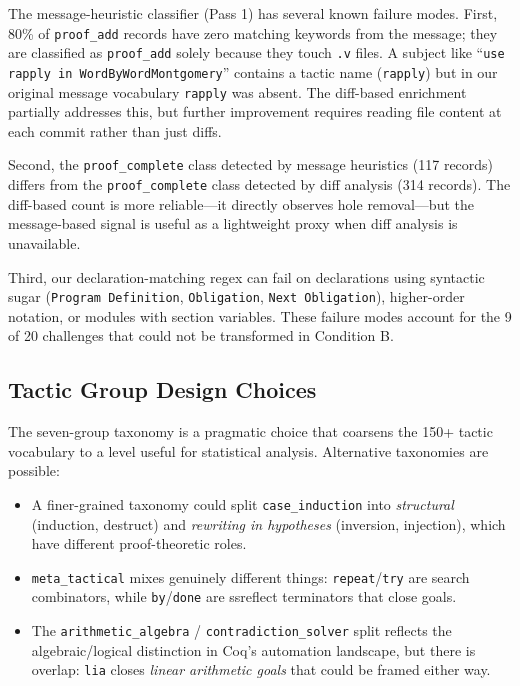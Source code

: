 \documentclass[11pt]{article}
\begin{document}
The message-heuristic classifier (Pass 1) has several known failure modes. First, 80\% of \texttt{proof\_add} records have zero matching keywords from the message; they are classified as \texttt{proof\_add} solely because they touch \texttt{.v} files. A subject like ``\texttt{use rapply in WordByWordMontgomery}'' contains a tactic name (\texttt{rapply}) but in our original message vocabulary \texttt{rapply} was absent. The diff-based enrichment partially addresses this, but further improvement requires reading file content at each commit rather than just diffs.

Second, the \texttt{proof\_complete} class detected by message heuristics (117 records) differs from the \texttt{proof\_complete} class detected by diff analysis (314 records). The diff-based count is more reliable---it directly observes hole removal---but the message-based signal is useful as a lightweight proxy when diff analysis is unavailable.

Third, our declaration-matching regex can fail on declarations using syntactic sugar (\texttt{Program Definition}, \texttt{Obligation}, \texttt{Next Obligation}), higher-order notation, or modules with section variables. These failure modes account for the 9 of 20 challenges that could not be transformed in Condition B.

\subsection{Tactic Group Design Choices}

The seven-group taxonomy is a pragmatic choice that coarsens the 150+ tactic vocabulary to a level useful for statistical analysis. Alternative taxonomies are possible:

\begin{itemize}
  \item A finer-grained taxonomy could split \texttt{case\_induction} into \textit{structural} (induction, destruct) and \textit{rewriting in hypotheses} (inversion, injection), which have different proof-theoretic roles.
  \item \texttt{meta\_tactical} mixes genuinely different things: \texttt{repeat}/\texttt{try} are search combinators, while \texttt{by}/\texttt{done} are ssreflect terminators that close goals.
  \item The \texttt{arithmetic\_algebra} / \texttt{contradiction\_solver} split reflects the algebraic/logical distinction in Coq's automation landscape, but there is overlap: \texttt{lia} closes \textit{linear arithmetic goals} that could be framed either way.
\end{itemize}
\end{document}
